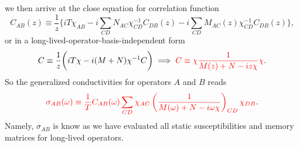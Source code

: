 \documentclass[10pt,nofootinbib,letterpaper]{revtex4}
\begin{document}
		we then arrive at the close equation for correlation function
		\begin{equation*}
			C_{AB}(z)\equiv\dfrac{1}{z}\bigg\{iT\chi_{AB}-i\sum_{CD}N_{AC}\chi_{CD}^{-1}C_{DB}(z)-i\sum_{CD}M_{AC}(z)\chi_{CD}^{-1}C_{DB}(z)\bigg\},
		\end{equation*}
		or in a long-lived-operator-basis-independent form
		\begin{equation}\label{1.2.5}
			C\equiv\dfrac{1}{z}\bigg(iT\chi-i(M+N)\chi^{-1}C\bigg)\implies {\color{red}C\equiv\chi\dfrac{1}{M(z)+N-iz\chi}\chi}.
		\end{equation}
		So the generalized conductivities for operators $A$ and $B$ reads
		\begin{equation}\label{1.2.6}
			{\color{red}\sigma_{AB}(\omega)\equiv\dfrac{1}{T}C_{AB}(\omega)\sum_{CD}\chi_{AC}\left(\dfrac{1}{M(\omega)+N-i\omega\chi}\right)_{CD}\chi_{DB}}.
		\end{equation}
		Namely, $\sigma_{AB}$ is know as we have evaluated all static susceptibilities and memory matrices for long-lived operators.
\end{document}

